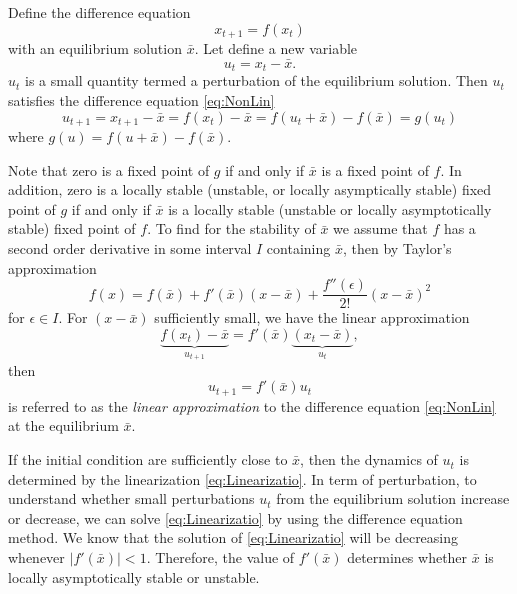 
\vspace{1cm}
Define the difference equation
\begin{equation}\label{eq:NonLin}
x_{t+1}=f(x_t)
\end{equation}
with an equilibrium solution $\bar x$. Let define a new variable
$$u_{t}=x_t-\bar x.$$
$u_t$ is a small quantity termed a perturbation of the equilibrium solution. Then $u_t$ satisfies the difference equation \eqref{eq:NonLin}
$$u_{t+1}=x_{t+1}-\bar x=f(x_t)-\bar x=f(u_t+\bar x)-f(\bar x)=g(u_t)$$
where $g(u)=f(u+\bar x)-f(\bar x)$.

Note that zero is a fixed point of $g$ if and only if $\bar x$ is a fixed point of $f$. In addition, zero is a locally stable (unstable, or locally asymptically stable) fixed point of $g$ if and only if $\bar x$ is a locally stable (unstable or locally asymptotically stable) fixed point of $f$. To find for the stability of $\bar x$ we assume that $f$ has a second order derivative in some interval $I$ containing $\bar x$, then by Taylor's approximation
$$f(x)=f(\bar x)+f'(\bar x)(x-\bar x)+\frac{f''(\epsilon)}{2!}(x-\bar x)^2$$
for $\epsilon \in I$. For $(x-\bar x)$ sufficiently small, we have the linear approximation
$$\underbrace{f(x_t)-\bar x}_{u_{t+1}}=f'(\bar x)\underbrace{(x_t-\bar x)}_{u_t},$$
then 
\begin{equation}\label{eq:Linearizatio}
u_{t+1}=f'(\bar x)u_t
\end{equation} is referred to as the \emph{linear approximation} to the difference equation \eqref{eq:NonLin} at the equilibrium $\bar x$.

If the initial condition are sufficiently close to $\bar x$, then the dynamics of $u_t$ is determined by the linearization \eqref{eq:Linearizatio}. In term of perturbation, to understand whether small perturbations $u_t$ from the equilibrium solution increase or decrease, we can solve \eqref{eq:Linearizatio} by using the difference equation method. We know that the solution of \eqref{eq:Linearizatio} will be decreasing whenever $|f'(\bar x)|<1$. Therefore, the value of $f'(\bar x)$ determines whether $\bar x$ is locally asymptotically stable or unstable.



